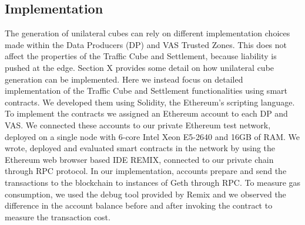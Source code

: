 



\subsection{Implementation}
The generation of unilateral cubes can rely on different implementation choices made within the Data Producers (DP) and VAS Trusted Zones. This does not affect the properties of the Traffic Cube and Settlement, because liability is pushed at the edge. Section X provides some detail on how unilateral cube generation can be implemented. 
Here we instead focus on detailed implementation of the Traffic Cube and Settlement functionalities using smart contracts. 
We developed them using Solidity, the Ethereum's scripting language. To implement the contracts we assigned an Ethereum account to each DP and VAS. We connected these accounts to our private Ethereum test network, deployed on a single node with 6-core Intel Xeon E5-2640 and 16GB of RAM. We wrote, deployed and evaluated smart contracts in the network by using the Ethereum web browser based IDE REMIX, connected to our private chain through RPC protocol. In our implementation, accounts prepare and send the transactions to the blockchain to instances of Geth through RPC. To measure gas consumption, we used the debug tool provided by Remix and we observed the difference in the account balance before and after invoking the contract to measure the transaction cost.

